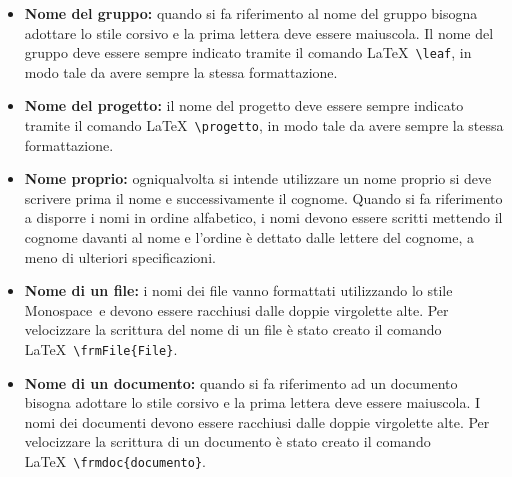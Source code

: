 \documentclass[../NormeProgetto.tex]{subfiles}
\begin{document}
				\begin{itemize}
					\item \textbf{Nome del gruppo:} quando si fa riferimento al nome del gruppo bisogna adottare lo stile corsivo e la prima lettera deve essere maiuscola.	
				Il nome del gruppo deve essere sempre indicato tramite il comando \LaTeX\ \texttt{\textbackslash leaf}, in modo tale da avere sempre la stessa formattazione.
				\item \textbf{Nome del progetto:} il nome del progetto deve essere sempre indicato tramite il comando \LaTeX\ \texttt{\textbackslash progetto}, in modo tale da avere sempre la stessa formattazione.
				\item \textbf{Nome proprio:} ogniqualvolta si intende utilizzare un nome proprio si deve scrivere prima il nome e successivamente il cognome. Quando si fa riferimento a disporre i nomi in ordine alfabetico, i nomi devono essere scritti mettendo il cognome davanti al nome e l'ordine è dettato dalle lettere del cognome, a meno di ulteriori specificazioni.				
				\item \textbf{Nome di un file:} i nomi dei file vanno formattati utilizzando lo stile Monospace\g\ e devono essere racchiusi dalle doppie virgolette alte.  Per velocizzare la scrittura del nome di un file è stato creato il comando \LaTeX\ \texttt{\textbackslash frmFile\{File\}}.				
				\item \textbf{Nome di un documento:} quando si fa riferimento ad un documento bisogna adottare lo stile corsivo e la prima lettera deve essere maiuscola. I  nomi dei documenti devono essere racchiusi dalle doppie virgolette alte. Per velocizzare la scrittura di un documento è stato creato il comando \LaTeX\ \texttt{\textbackslash frmdoc\{documento\}}.				
				\end{itemize}
\end{document}
